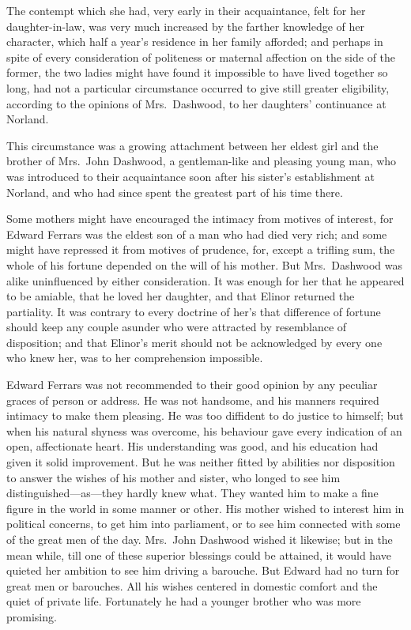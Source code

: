 \documentclass{article}
\begin{document}
The contempt which she had, very early in their acquaintance,
felt for her daughter-in-law, was very much increased
by the farther knowledge of her character, which half
a year's residence in her family afforded; and perhaps
in spite of every consideration of politeness or maternal
affection on the side of the former, the two ladies might
have found it impossible to have lived together so long,
had not a particular circumstance occurred to give
still greater eligibility, according to the opinions
of Mrs.\ Dashwood, to her daughters' continuance at Norland.

This circumstance was a growing attachment between
her eldest girl and the brother of Mrs.\ John Dashwood,
a gentleman-like and pleasing young man, who was introduced
to their acquaintance soon after his sister's establishment
at Norland, and who had since spent the greatest part
of his time there.

Some mothers might have encouraged the intimacy from
motives of interest, for Edward Ferrars was the eldest son
of a man who had died very rich; and some might have repressed
it from motives of prudence, for, except a trifling sum,
the whole of his fortune depended on the will of his mother.
But Mrs.\ Dashwood was alike uninfluenced by either consideration.
It was enough for her that he appeared to be amiable,
that he loved her daughter, and that Elinor returned
the partiality.  It was contrary to every doctrine of
her's that difference of fortune should keep any couple
asunder who were attracted by resemblance of disposition;
and that Elinor's merit should not be acknowledged
by every one who knew her, was to her comprehension impossible.

Edward Ferrars was not recommended to their good
opinion by any peculiar graces of person or address.
He was not handsome, and his manners required intimacy
to make them pleasing.  He was too diffident to do justice
to himself; but when his natural shyness was overcome,
his behaviour gave every indication of an open,
affectionate heart.  His understanding was good,
and his education had given it solid improvement.
But he was neither fitted by abilities nor disposition
to answer the wishes of his mother and sister, who longed
to see him distinguished---as---they hardly knew what.
They wanted him to make a fine figure in the world in some
manner or other.  His mother wished to interest him in
political concerns, to get him into parliament, or to see
him connected with some of the great men of the day.
Mrs.\ John Dashwood wished it likewise; but in the mean while,
till one of these superior blessings could be attained, it would
have quieted her ambition to see him driving a barouche.
But Edward had no turn for great men or barouches.
All his wishes centered in domestic comfort and the quiet
of private life.  Fortunately he had a younger brother
who was more promising.
\end{document}
